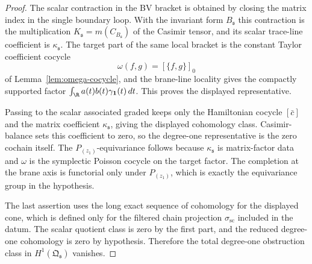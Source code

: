 \begin{proof}
  The scalar contraction in the BV bracket is obtained by closing the
  matrix index in the single boundary loop.  With the invariant form
  \(B_{\mathfrak s}\) this contraction is the multiplication
  \(K_{\mathfrak s}=m(C_{B_{\mathfrak s}})\) of the Casimir tensor, and
  its scalar trace-line coefficient is \(\kappa_{\mathfrak s}\).  The target
  part of the same local bracket is the constant Taylor coefficient
  cocycle
  \[
    \omega(f,g)=[\{f,g\}]_0
  \]
  of Lemma~\ref{lem:omega-cocycle}, and the brane-line locality gives
  the compactly supported factor
  \(\int_\R a(t)b(t)\gamma_{\mathbf 1}(t)\,dt\).  This proves the
  displayed representative.

  Passing to the scalar associated graded keeps only the Hamiltonian
  cocycle \([\bar c]\) and the matrix coefficient
  \(\kappa_{\mathfrak s}\), giving the displayed cohomology class.
	  Casimir-balance sets this coefficient to
	  zero, so the degree-one representative is the zero cochain itself.
	  The \(P_{(z_1)}\)-equivariance follows because
  \(\kappa_{\mathfrak s}\) is matrix-factor data and \(\omega\) is the
  symplectic Poisson cocycle on the target
  factor.  The completion at the brane axis is functorial only under
  \(P_{(z_1)}\), which is exactly the equivariance group in the
  hypothesis.

  The last assertion uses the long exact sequence of cohomology for the
  displayed cone, which is defined only for the filtered chain projection
  \(\widehat\sigma_{\mathrm{sc}}\) included in the datum.  The scalar
  quotient class is zero by the first part,
  and the reduced degree-one cohomology is zero by hypothesis.  Therefore
  the total degree-one obstruction class in
  \(H^1(\mathfrak Q_{\mathfrak s})\) vanishes.
\end{proof}

